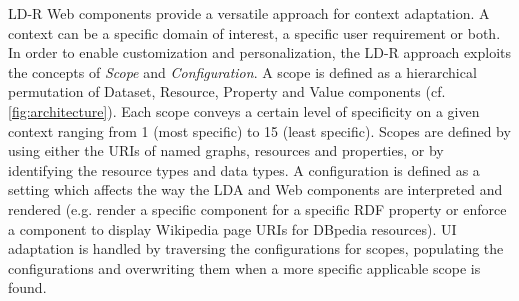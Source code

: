 \documentclass{llncs}
\begin{document}

LD-R Web components provide a versatile approach for context adaptation.
A context can be a specific domain of interest, a specific user requirement or both.
In order to enable customization and personalization, the LD-R approach exploits the concepts of \emph{Scope} and \emph{Configuration}.
A scope is defined as a hierarchical permutation of Dataset, Resource, Property and Value components (cf. \autoref{fig:architecture}).
Each scope conveys a certain level of specificity on a given context ranging from 1 (most specific) to 15 (least specific).
Scopes are defined by using either the URIs of named graphs, resources and properties, or by identifying the resource types and data types.
A configuration is defined as a setting which affects the way the LDA and Web components are interpreted and rendered (e.g. render a specific component for a specific RDF property or enforce a component to display Wikipedia page URIs for DBpedia resources).
UI adaptation is handled by traversing the configurations for scopes, populating the configurations and overwriting them when a more specific applicable scope is found.

\end{document}
